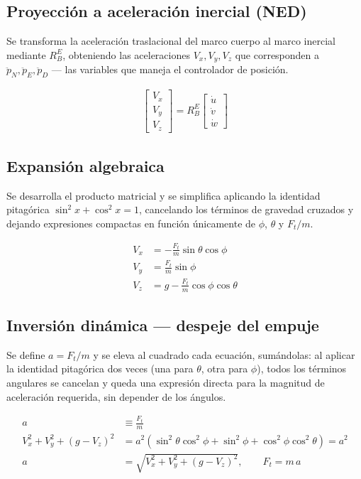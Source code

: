 \documentclass[11pt,a4paper]{article}
\begin{document}
\subsection*{Proyección a aceleración inercial (NED)}

Se transforma la aceleración traslacional del marco cuerpo al marco inercial mediante $R^E_B$, obteniendo las aceleraciones $V_x, V_y, V_z$ que corresponden a $\ddot p_N, \ddot p_E, \ddot p_D$ --- las variables que maneja el controlador de posición.

\begin{align}
\begin{bmatrix} V_x \\ V_y \\ V_z \end{bmatrix} = R^E_B
\begin{bmatrix} \dot u \\ \dot v \\ \dot w \end{bmatrix}
\end{align}

\subsection*{Expansión algebraica}

Se desarrolla el producto matricial y se simplifica aplicando la identidad pitagórica $\sin^2 x+\cos^2 x=1$, cancelando los términos de gravedad cruzados y dejando expresiones compactas en función únicamente de $\phi$, $\theta$ y $F_t/m$.

\begin{align}
V_x &= -\frac{F_t}{m}\sin\theta\cos\phi \\
V_y &= \frac{F_t}{m}\sin\phi \\
V_z &= g - \frac{F_t}{m}\cos\phi\cos\theta
\end{align}

\subsection*{Inversión dinámica --- despeje del empuje}

Se define $a=F_t/m$ y se eleva al cuadrado cada ecuación, sumándolas: al aplicar la identidad pitagórica dos veces (una para $\theta$, otra para $\phi$), todos los términos angulares se cancelan y queda una expresión directa para la magnitud de aceleración requerida, sin depender de los ángulos.

\begin{align}
a &\equiv \frac{F_t}{m} \\
V_x^2+V_y^2+(g-V_z)^2 &= a^2\left(\sin^2\theta\cos^2\phi+\sin^2\phi+\cos^2\phi\cos^2\theta\right) = a^2 \\
a &= \sqrt{V_x^2+V_y^2+(g-V_z)^2}, \qquad F_t = m\,a
\end{align}
\end{document}
